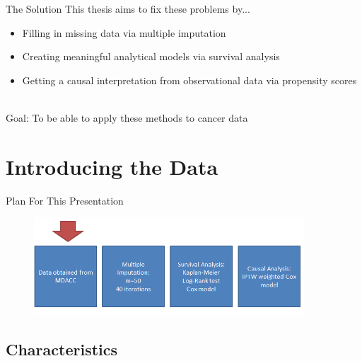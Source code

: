 \begin{frame}{The Solution}
This thesis aims to fix these problems by...
  \begin{itemize}
   \item Filling in missing data via multiple imputation
   \item Creating meaningful analytical models via survival analysis
   \item Getting a causal interpretation from observational data via propensity scores\\~\\
  \end{itemize}
Goal: To be able to apply these methods to cancer data

\end{frame}


\section{Introducing the Data}
\begin{frame}{Plan For This Presentation}
  \begin{figure}[h!]
  \centering
    \includegraphics[width=0.9\textwidth]{data_flow}
\label{fig:data_flow}
\end{figure} 
\end{frame}

\subsection{Characteristics}

